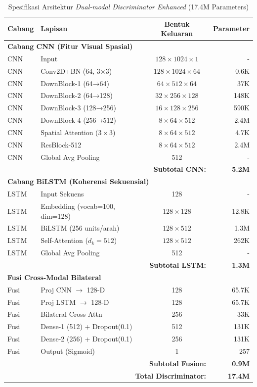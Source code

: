\begin{table}[H]
\centering
\caption{Spesifikasi Arsitektur \textit{Dual-modal Discriminator Enhanced} (17.4M Parameters)}
\label{tab:appendix-discriminator-arch}
\small
\begin{tabular}{|l|l|c|r|}
\hline
\textbf{Cabang} & \textbf{Lapisan} & \textbf{Bentuk Keluaran} & \textbf{Parameter} \\
\hline
\multicolumn{4}{|l|}{\textbf{Cabang CNN (Fitur Visual Spasial)}} \\
\hline
CNN & Input & $128 \times 1024 \times 1$ & - \\
CNN & Conv2D+BN (64, 3×3) & $128 \times 1024 \times 64$ & 0.6K \\
CNN & DownBlock-1 (64→64) & $64 \times 512 \times 64$ & 37K \\
CNN & DownBlock-2 (64→128) & $32 \times 256 \times 128$ & 148K \\
CNN & DownBlock-3 (128→256) & $16 \times 128 \times 256$ & 590K \\
CNN & DownBlock-4 (256→512) & $8 \times 64 \times 512$ & 2.4M \\
CNN & Spatial Attention ($3 \times 3$) & $8 \times 64 \times 512$ & 4.7K \\
CNN & ResBlock-512 & $8 \times 64 \times 512$ & 2.4M \\
CNN & Global Avg Pooling & 512 & - \\
\hline
\multicolumn{3}{|r|}{\textbf{Subtotal CNN:}} & \textbf{5.2M} \\
\hline
\multicolumn{4}{|l|}{\textbf{Cabang BiLSTM (Koherensi Sekuensial)}} \\
\hline
LSTM & Input Sekuens & 128 & - \\
LSTM & Embedding (vocab=100, dim=128) & $128 \times 128$ & 12.8K \\
LSTM & BiLSTM (256 units/arah) & $128 \times 512$ & 1.3M \\
LSTM & Self-Attention ($d_k=512$) & $128 \times 512$ & 262K \\
LSTM & Global Avg Pooling & 512 & - \\
\hline
\multicolumn{3}{|r|}{\textbf{Subtotal LSTM:}} & \textbf{1.3M} \\
\hline
\multicolumn{4}{|l|}{\textbf{Fusi Cross-Modal Bilateral}} \\
\hline
Fusi & Proj CNN $\rightarrow$ 128-D & 128 & 65.7K \\
Fusi & Proj LSTM $\rightarrow$ 128-D & 128 & 65.7K \\
Fusi & Bilateral Cross-Attn & 256 & 33K \\
Fusi & Dense-1 (512) + Dropout(0.1) & 512 & 131K \\
Fusi & Dense-2 (256) + Dropout(0.1) & 256 & 131K \\
Fusi & Output (Sigmoid) & 1 & 257 \\
\hline
\multicolumn{3}{|r|}{\textbf{Subtotal Fusion:}} & \textbf{0.9M} \\
\hline
\multicolumn{3}{|r|}{\textbf{Total Discriminator:}} & \textbf{17.4M} \\
\hline
\end{tabular}
\end{table}

